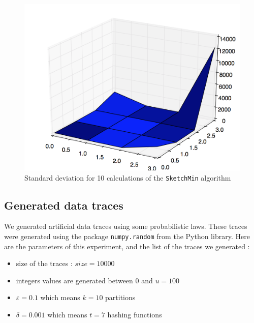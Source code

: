\documentclass[a4paper]{article}%
\begin{document}
\begin{figure}[H]
	\center
	\includegraphics[scale=0.25]{realtests10times.png}
	\caption{\footnotesize Standard deviation for 10 calculations of the \texttt{SketchMin} algorithm}
	\label{ref:exp_real_stdev}
\end{figure}



\subsection{Generated data traces}


We generated artificial data traces using some probabilistic laws. These traces were generated using the package \texttt{numpy.random} from the Python library. Here are the parameters of this experiment, and the list of the traces we generated :
\begin{itemize}
	\item size of the traces : $size = 10 000$
	\item integers values are generated between $0$ and $u = 100$
	\item $\varepsilon = 0.1$ which means $k = 10$ partitions
	\item $\delta = 0.001$ which means $t = 7$ hashing functions
\end{itemize}
\end{document}
